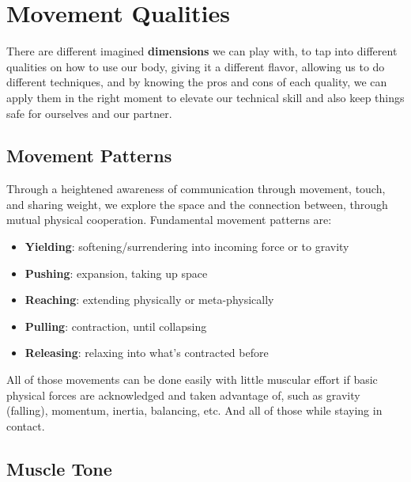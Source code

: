 \section{Movement Qualities}\label{sec:movement-qualities}

There are different imagined \textbf{dimensions} we can play with, to tap into different qualities on how to use our body, giving it a different flavor, allowing us to do different techniques, and by knowing the pros and cons of each quality, we can apply them in the right moment to elevate our technical skill and also keep things safe for ourselves and our partner.

\subsection{Movement Patterns}\label{subsec:movement-patterns}

Through a heightened awareness of communication through movement, touch, and sharing weight, we explore the space and the connection between, through mutual physical cooperation.
Fundamental movement patterns are:

\begin{itemize}
    \setlength\itemsep{0em}
    \item [] \textbf{Yielding}: softening/surrendering into incoming force or to gravity
    \item [] \textbf{Pushing}: expansion, taking up space
    \item [] \textbf{Reaching}: extending physically or meta-physically
    \item [] \textbf{Pulling}: contraction, until collapsing
    \item [] \textbf{Releasing}: relaxing into what's contracted before
\end{itemize}

All of those movements can be done easily with little muscular effort if basic physical forces are acknowledged and taken advantage of, such as gravity (falling), momentum, inertia, balancing, etc.
And all of those while staying in contact.

\subsection{Muscle Tone}\label{subsec:muscle-tone}

